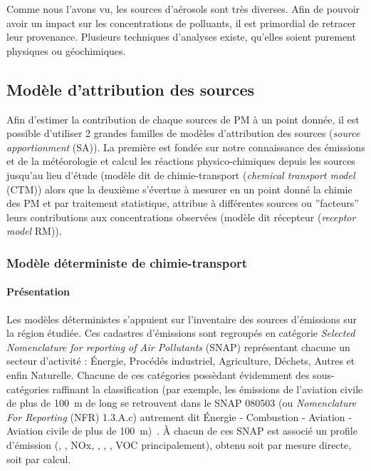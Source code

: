 Comme nous l'avons vu, les sources d'aérosols sont très diverses.
Afin de pouvoir avoir un impact sur les concentrations de polluants, il est primordial de
retracer leur provenance. Plusieurs techniques d'analyses existe, qu'elles soient purement
physiques ou géochimiques.

\subsection{Modèle d'attribution des sources}%
\label{sec:source_apportionment_model}

Afin d'estimer la contribution de chaque sources de PM à un point donnée, il est possible
d'utiliser 2 grandes familles de modèles d'attribution des sources (\textit{source
apportionment} (SA)). La première est fondée sur notre connaissance des
émissions et de la météorologie et calcul les réactions physico-chimiques depuis les
sources jusqu'au lieu d'étude (modèle dit de chimie-transport (\textit{chemical transport
model} (CTM)) alors que la deuxième s'évertue à mesurer en un point donné
la chimie des PM et par traitement statistique, attribue à différentes sources ou
''facteurs'' leurs contributions aux concentrations observées (modèle dit récepteur
(\textit{receptor model} RM)).

\subsubsection{Modèle déterministe de chimie-transport}%
\label{ssub:modele_deterministe_de_chimietransport}

\paragraph{Présentation}%
\label{par:presentation}

Les modèles déterministes s'appuient sur l'inventaire des sources d'émissions sur la
région étudiée. Ces cadastres d'émissions sont regroupés en catégorie \textit{Selected
Nomenclature for reporting of Air Pollutants} (SNAP) représentant chacune un secteur
d'activité : Énergie, Procédés industriel, Agriculture, Déchets, Autres et enfin
Naturelle.
Chacune de ces catégories possèdant évidemment des sous-catégories raffinant la
classification (par exemple, les émissions de l'aviation civile de plus de \SI{100}{m} de
long se retrouvent dans le SNAP 080503 (ou \textit{Nomenclature For Reporting} (NFR)
1.3.A.c) autrement dit Énergie - Combustion - Aviation - Aviation civile de plus de
\SI{100}{m})~\autocite{europeanenvironmentagencyEMEP2019}.
À chacun de ces SNAP est associé un profile d'émission (, , NOx, , \PMdix, \PMdc,
VOC principalement), obtenu soit par mesure directe, soit par calcul.

